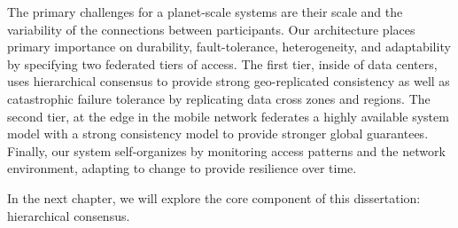 The primary challenges for a planet-scale systems are their scale and the variability of the connections between participants.
Our architecture places primary importance on durability, fault-tolerance, heterogeneity, and adaptability by specifying two federated tiers of access.
The first tier, inside of data centers, uses hierarchical consensus to provide strong geo-replicated consistency as well as catastrophic failure tolerance by replicating data cross zones and regions.
The second tier, at the edge in the mobile network federates a highly available system model with a strong consistency model to provide stronger global guarantees.
Finally, our system self-organizes by monitoring access patterns and the network environment, adapting to change to provide resilience over time.

In the next chapter, we will explore the core component of this dissertation: hierarchical consensus.
